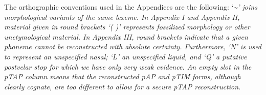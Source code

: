 The orthographic conventions used in the Appendices are the following: {\textquoteleft}\emph{\textup{\~{}{\textquoteright} joins morphological variants of the same lexeme. In Appendix I and Appendix II, material given in }}\emph{\textup{round brackets {\textquoteleft}( ){\textquoteright} represents fossilized morphology or other unetymological material. In Appendix III, round brackets indicate that a given phoneme cannot be reconstructed with absolute certainty. Furthermore, {\textquoteleft}N{\textquoteright} is used to represent an unspecified nasal; {\textquoteleft}L{\textquoteright} an unspecified liquid, and {\textquoteleft}Q{\textquoteright} a putative postvelar stop for which we have only very weak evidence. An empty slot in the pTAP column means that the reconstructed pAP and pTIM forms, although clearly cognate, are too different to allow for a secure pTAP reconstruction. }}

\clearpage\setcounter{page}{1}\pagestyle{Convertedvi}
